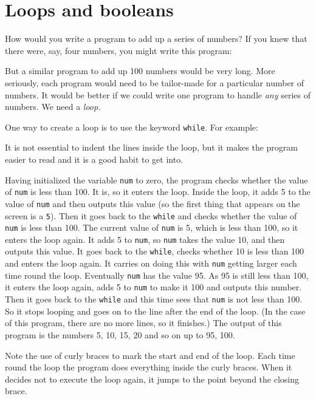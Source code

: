 \section{Loops and booleans}

How would you write a program to add up a series of numbers?
If you knew that there were, say, four numbers, you might write
this program:


But a similar program to add up 100 numbers would be very long.
More seriously, each program would need to be tailor-made for a particular
number of numbers.  It would be better if we could write one program
to handle \emph{any} series of numbers.  We need a \emph{loop.}

One way to create a loop is to use the keyword \texttt{while}.
For example:


It is not essential to indent the lines inside the loop, but it makes the
program easier to read and it is a good habit to get into.


Having initialized the variable \texttt{num} to zero, the program checks
whether the value of \texttt{num} is less than 100.  It is, so it
enters the loop.  Inside the loop, it adds 5 to the value of
\texttt{num} and then outputs this value (so the first thing that
appears on the screen is a \texttt{5}).  Then it goes back to the
  \texttt{while} and checks whether the value of \texttt{num} is less than
100.  The current value of \texttt{num} is 5, which is less than 100,
so it enters the loop again.  It adds 5 to \texttt{num}, so
\texttt{num} takes the value 10, and then outputs this value.  It goes back
to the \texttt{while}, checks whether 10 is less than 100 and enters
the loop again.  It carries on doing this with \texttt{num} getting
larger each time round the loop.  Eventually \texttt{num} has the
value 95. As 95 is still less than 100, it enters the loop again, adds 5 to
\texttt{num} to make it 100 and outputs this number.  Then it goes
back to the \texttt{while} and this time sees that \texttt{num} is not
less than 100.  So it stops looping and goes on to the line after the
end of the loop.  (In the case of this program, there are no more
lines, so it finishes.)  The output of this program is the numbers 5,
10, 15, 20 and so on up to 95, 100.

Note the use of curly braces to mark the start and end of the loop.
Each time round the loop the program does everything inside the curly braces.
When it decides not to execute the loop again, it jumps to the point
beyond the closing brace.


